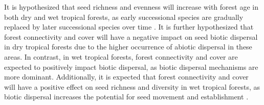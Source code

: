 It is hypothesized that seed richness and evenness will increase with forest age in both dry and wet tropical forests, as early successional species are gradually replaced by later successional species over time \citep{chazdonNaturalRegenerationTool2016}. It is further hypothesized that forest connectivity and cover will have a negative impact on seed biotic dispersal in dry tropical forests due to the higher occurrence of abiotic dispersal in these areas. In contrast, in wet tropical forests, forest connectivity and cover are expected to positively impact biotic dispersal, as biotic dispersal mechanisms are more dominant. Additionally, it is expected that forest connectivity and cover will have a positive effect on seed richness and diversity in wet tropical forests, as biotic dispersal increases the potential for seed movement and establishment \citep{dentUnitingNicheDifferentiation2021}.
